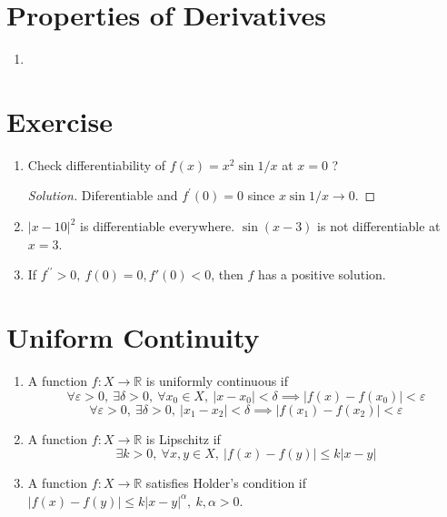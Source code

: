 \section{Properties of Derivatives}
\begin{enumerate}
	\item
\end{enumerate}

\section{Exercise}
\begin{enumerate}
	\item Check differentiability of $f(x) = x^2 \sin 1/x$ at $x = 0$ ?
	\begin{proof}[Solution]
		Diferentiable and $f^\prime(0) = 0$ since $x\sin 1/x \to 0$.
	\end{proof}
	\item 
	\subitem $|x-10|^2$ is differentiable everywhere.
	\subitem $\sin (x-3)$ is not differentiable at $x = 3$.
	\item If $f^{\prime\prime} > 0,\ f(0) = 0, f'(0) < 0$, then $f$ has a positive solution.
\end{enumerate}

\section{Uniform Continuity}
\begin{enumerate}
	\item A function $f : X \to \mathbb{R}$ is uniformly continuous if 
		$$ \forall \varepsilon > 0,\ \exists \delta > 0,\ \forall x_0 \in X,\ |x-x_0|<\delta \implies |f(x)-f(x_0)| < \varepsilon $$
		$$ \forall \varepsilon > 0,\ \exists \delta > 0,\ |x_1-x_2| < \delta \implies |f(x_1)-f(x_2)| < \varepsilon $$
	\item A function $f : X \to \mathbb{R}$ is Lipschitz if 
		$$ \exists k > 0,\ \forall x,y \in X,\ |f(x)-f(y)| \le k|x-y|$$
	\item A function $f : X \to \mathbb{R}$ satisfies Holder's condition if $|f(x)-f(y)| \le k|x-y|^\alpha,\ k,\alpha > 0$.
\end{enumerate}

